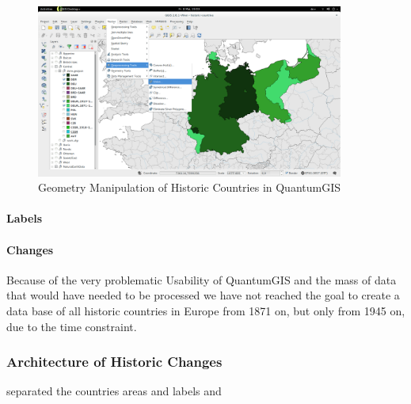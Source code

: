 \begin{figure}[H]
  \begin{center}
    \includegraphics[width=0.9\textwidth]{graphics/qgis.png}
  \end{center}
  \caption{Geometry Manipulation of Historic Countries in QuantumGIS}
  \label{fig:qgis}
\end{figure}
\label{par:geometry}

\paragraph{Labels} %
\label{par:labels}


\paragraph{Changes} %
\label{par:changes}


Because of the very problematic Usability of QuantumGIS and the mass of data that would have needed to be processed we have not reached the goal to create a data base of all historic countries in Europe from 1871 on, but only from 1945 on, due to the time constraint.


\subsubsection{Architecture of Historic Changes} %
\label{ssub:architecture_of_historic_changes}
separated the countries areas and labels and


